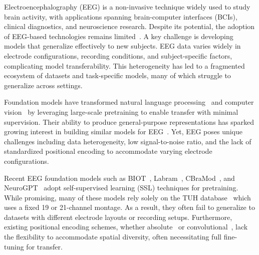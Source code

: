 \documentclass{article}
\begin{document}
Electroencephalography (EEG) is a non-invasive technique widely used to study brain activity, with applications spanning brain-computer interfaces (BCIs), clinical diagnostics, and neuroscience research. 
Despite its potential, the adoption of EEG-based technologies remains limited~\citep{lotte2018review}. A key challenge is developing models that generalize effectively to new subjects. EEG data varies widely in electrode configurations, recording conditions, and subject-specific factors, complicating model transferability. 
This heterogeneity has led to a fragmented ecosystem of datasets and task-specific models, many of which struggle to generalize across settings.

Foundation models have transformed natural language processing~\citep{achiam2023gpt4, dubey2024llama3, warner2024modernbert} and computer vision~\citep{radford2021learning, caron2021emerging, kirillov2023segment} by leveraging large-scale pretraining to enable transfer with minimal supervision. Their ability to produce general-purpose representations has sparked growing interest in building similar models for EEG~\citep{yang2024biot, wang2024cbramod, jiang2024labram, cui2024neuro, yuan2024brant2, wang2024eegpt}. Yet, EEG poses unique challenges including data heterogeneity, low signal-to-noise ratio, and the lack of standardized positional encoding to accommodate varying electrode configurations.

Recent EEG foundation models such as BIOT~\citep{yang2024biot}, Labram~\citep{jiang2024labram}, CBraMod~\citep{wang2024cbramod}, and NeuroGPT~\citep{cui2024neuro} adopt self-supervised learning (SSL) techniques for pretraining. While promising, many of these models rely solely on the TUH database~\citep{obeid2016temple} which uses a fixed 19 or 21-channel montage. As a result, they often fail to generalize to datasets with different electrode layouts or recording setups. Furthermore, existing positional encoding schemes, whether absolute~\citep{yang2024biot, jiang2024labram} or convolutional~\citep{wang2024cbramod}, lack the flexibility to accommodate spatial diversity, often necessitating full fine-tuning for transfer.
\end{document}
